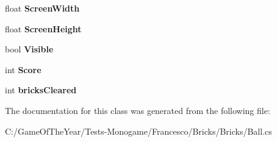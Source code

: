 \begin{DoxyCompactItemize}
\item 
\mbox{\label{class_bricks_1_1__ball_a4dafc9ccb697a8d7971e8f466d84bec7}} 
float {\bfseries Screen\+Width}
\item 
\mbox{\label{class_bricks_1_1__ball_a633cdebf86dc8f2a3c5687f0e5e9bd35}} 
float {\bfseries Screen\+Height}
\item 
\mbox{\label{class_bricks_1_1__ball_a01ccb3ead7ea7a04970d0ae744778920}} 
bool {\bfseries Visible}
\item 
\mbox{\label{class_bricks_1_1__ball_a508aa14749167c9560971b665ee9cfec}} 
int {\bfseries Score}
\item 
\mbox{\label{class_bricks_1_1__ball_af139bcda68a1dee11798300140bac515}} 
int {\bfseries bricks\+Cleared}
\end{DoxyCompactItemize}


The documentation for this class was generated from the following file\+:\begin{DoxyCompactItemize}
\item 
C\+:/\+Game\+Of\+The\+Year/\+Tests-\/\+Monogame/\+Francesco/\+Bricks/\+Bricks/Ball.\+cs\end{DoxyCompactItemize}
